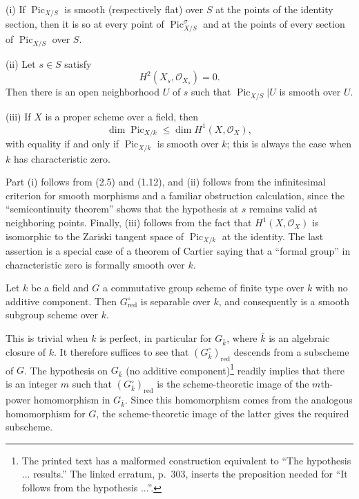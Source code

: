 
\noindent(i) If $\operatorname{Pic}_{X/S}$ is smooth (respectively flat) over
$S$ at the points of the identity section, then it is so at every point of
$\operatorname{Pic}_{X/S}^\sigma$ and at the points of every section of
$\operatorname{Pic}_{X/S}$ over $S$.

\noindent(ii) Let $s\in S$ satisfy
\[
H^2(X_s,\mathcal O_{X_s})=0.
\]
Then there is an open neighborhood $U$ of $s$ such that
$\operatorname{Pic}_{X/S}|U$ is smooth over $U$.

\noindent(iii) If $X$ is a proper scheme over a field, then
\[
\dim\operatorname{Pic}_{X/k}\leq\dim H^1(X,\mathcal O_X),
\]
with equality if and only if $\operatorname{Pic}_{X/k}$ is smooth over $k$;
this is always the case when $k$ has characteristic zero.

Part (i) follows from (2.5) and (1.12), and (ii) follows from the infinitesimal
criterion for smooth morphisms and a familiar obstruction calculation, since
the “semicontinuity theorem” shows that the hypothesis at $s$ remains valid at
neighboring points. Finally, (iii) follows from the fact that
$H^1(X,\mathcal O_X)$ is isomorphic to the Zariski tangent space of
$\operatorname{Pic}_{X/k}$ at the identity. The last assertion is a special
case of a theorem of Cartier saying that a “formal group” in characteristic
zero is formally smooth over $k$.


 Let $k$ be a field and $G$ a commutative group
scheme of finite type over $k$ with no additive component. Then
$G_{\mathrm{red}}^\circ$ is separable over $k$, and consequently is a smooth
subgroup scheme over $k$.

This is trivial when $k$ is perfect, in particular for $G_{\bar k}$, where
$\bar k$ is an algebraic closure of $k$. It therefore suffices to see that
$(G_{\bar k}^\circ)_{\mathrm{red}}$ descends from a subscheme of $G$. The
hypothesis on $G_{\bar k}$ (no additive component)\footnote{The printed text
has a malformed construction equivalent to “The hypothesis ... results.” The
linked erratum, p.~303, inserts the preposition needed for “It follows from the
hypothesis ...”.} readily implies that there
is an integer $m$ such that $(G_{\bar k}^\circ)_{\mathrm{red}}$ is the
scheme-theoretic image of the $m$th-power homomorphism in $G_{\bar k}$. Since
this homomorphism comes from the analogous homomorphism for $G$, the
scheme-theoretic image of the latter gives the required subscheme.


